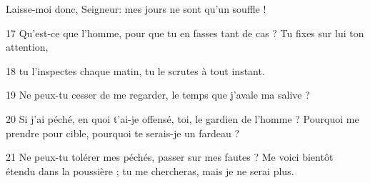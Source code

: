 Laisse-moi donc, Seigneur: mes jours ne sont qu’un souffle !

17 Qu’est-ce que l’homme, pour que tu en fasses tant de cas ? Tu fixes sur lui ton attention,

18 tu l’inspectes chaque matin, tu le scrutes à tout instant.

19 Ne peux-tu cesser de me regarder, le temps que j’avale ma salive ?

20 Si j’ai péché, en quoi t’ai-je offensé, toi, le gardien de l’homme ? Pourquoi me prendre pour cible, pourquoi te serais-je un fardeau ?

21 Ne peux-tu tolérer mes péchés, passer sur mes fautes ? Me voici bientôt étendu dans la poussière ; tu me chercheras, mais je ne serai plus.